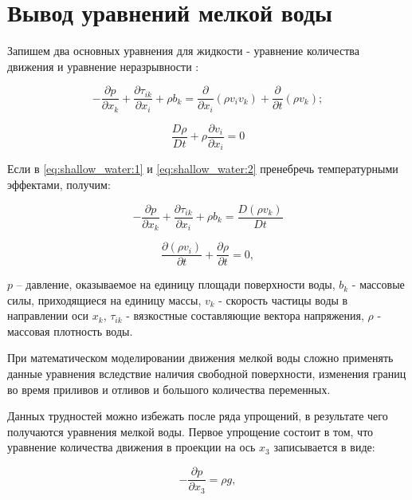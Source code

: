 \documentclass[14pt]{extreport}
\begin{document}
 
\chapter{Вывод уравнений мелкой воды}

Запишем два основных уравнения для жидкости - уравнение количества движения и уравнение неразрывности \cite{bib:fem:konor}:

\begin{equation}\label{eq:shallow_water:1}
-\frac{\partial p}{\partial x_k} + \frac{\partial \tau_{ik}}{\partial x_i} + \rho b_k = \frac{\partial}{\partial x_i}(\rho v_i v_k) + \frac{\partial}{\partial t}(\rho v_k);
\end{equation}

\begin{equation}\label{eq:shallow_water:2}
\frac{D\rho}{Dt}+\rho \frac{\partial v_i}{\partial x_i} =0
\end{equation}

Если в \ref{eq:shallow_water:1} и \ref{eq:shallow_water:2} пренебречь температурными эффектами, получим:

\begin{equation}\label{eq:shallow_water:3}
-\frac{\partial p}{\partial x_k} + \frac{\partial \tau_{ik}}{\partial x_i} + \rho b_k = \frac{D(\rho v_k)}{Dt}
\end{equation}

\begin{equation}\label{eq:shallow_water:4}
\frac{\partial (\rho v_i)}{\partial t} + \frac{\partial \rho}{\partial t}=0,
\end{equation}

 $p$ -- давление, оказываемое на единицу площади поверхности воды, $b_k$ - массовые силы, приходящиеся на единицу массы, $v_k$ - скорость частицы воды в направлении оси $x_k$, $\tau_{ik}$ - вязкостные составляющие вектора напряжения, $\rho$ - массовая плотность воды.

При математическом моделировании движения мелкой воды сложно применять данные уравнения вследствие наличия свободной поверхности, изменения границ во время приливов и отливов и большого количества переменных.

Данных трудностей можно избежать после ряда упрощений, в результате чего получаются уравнения мелкой воды. Первое упрощение состоит в том, что уравнение количества движения в проекции на ось $x_3$ записывается в виде:

\begin{equation}\label{eq:shallow_water:5}
-\frac{\partial p}{\partial x_3}=\rho g, 
\end{equation}
\end{document}
